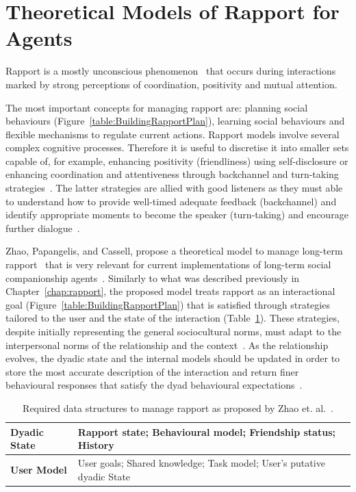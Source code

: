 \section{Theoretical Models of Rapport for Agents}
\label{sec:ComputationalModelsOfRapport}

Rapport is a mostly unconscious phenomenon~\cite{Zwiers2011} that occurs during interactions marked by strong perceptions of coordination, positivity and mutual attention.

The most important concepts for managing rapport are: planning social behaviours (Figure~\ref{table:BuildingRapportPlan}), learning social behaviours and flexible mechanisms to regulate current actions. Rapport models involve several complex cognitive processes. Therefore it is useful to discretise it into smaller sets capable of, for example, enhancing positivity (friendliness) using self-disclosure or enhancing coordination and attentiveness through backchannel and turn-taking strategies~\cite{Sacks1974, Kahn2008, Welbergen2012}. The latter strategies are allied with good listeners as they must able to understand how to provide well-timed adequate feedback (backchannel) and identify appropriate moments to become the speaker (turn-taking) and encourage further dialogue~\cite{Sacks1974, Poppe2010}.

Zhao, Papangelis, and Cassell, propose a theoretical model to manage long-term rapport~\cite{Zhao2014, Papangelis2014} that is very relevant for current implementations of long-term social companionship agents~\cite{Lisetti2013, Bickmore2005, Kang2005}. Similarly to what was described previously in Chapter~\ref{chap:rapport}, the proposed model treats rapport as an interactional goal (Figure~\ref{table:BuildingRapportPlan}) that is satisfied through strategies tailored to the user and the state of the interaction (Table~\ref{table:TCArchitectureDyadicRapportManagement:State}). These strategies, despite initially representing the general sociocultural norms, must adapt to the interpersonal norms of the relationship and the context~\cite{Zhao2014}. As the relationship evolves, the dyadic state and the internal models should be updated in order to store the most accurate description of the interaction and return finer behavioural responses that satisfy the dyad behavioural expectations~\cite{Papangelis2014}.


\begin{table}[H]
	\centering
	\begin{tabular}{|l|l|}
	\hline
	\textbf{Dyadic State} & Rapport state; Behavioural model; Friendship status; History \\ \hline
	\textbf{User Model} & User goals; Shared knowledge; Task model; User's putative dyadic State \\ \hline
	\end{tabular}
    \caption{Required data structures to manage rapport as proposed by Zhao et. al.~\cite{Zhao2014}.}
    \label{table:TCArchitectureDyadicRapportManagement:State}
\end{table}

